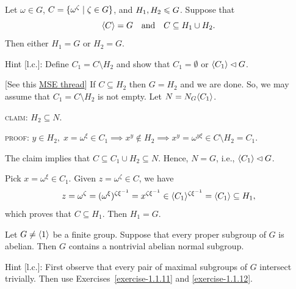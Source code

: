 \begin{exr}
    Let\/ $\omega \in G$, $C = \{\omega^\zeta \mid\zeta\in G\}$, and\/ $H_1, H_2\leqslant G$. Suppose that
    $$
        \langle C\rangle = G\quad\text{\upshape and}\quad C \subseteq H_1 \cup H_2.
    $$
    Then either\/ $H_1 = G$ or\/ $H_2 = G$.

    \textrm{\upshape Hint [l.c.]: Define $C_1=C\setminus H_2$ and show that $C_1=\emptyset$ or $\langle C_1\rangle\lhd G$.}
\end{exr}

\begin{solution} {[See this \href{https://math.stackexchange.com/a/1107676/269050}{MSE thread}]} If $C\subseteq H_2$ then $G=H_2$ and we are done. So, we may assume that $C_1=C\setminus H_2$ is not empty. Let $N=N_G\langle C_1\rangle$.

\textsc{claim:} $H_2\subseteq N$.

\textsc{proof:} $y\in H_2,\;x=\omega^\xi\in C_1\implies x^y\notin H_2\implies x^y=\omega^{y\xi}\in C\setminus H_2=C_1$.

The claim implies that $C\subseteq C_1\cup H_2 \subseteq N$. Hence, $N=G$, i.e., $\langle C_1\rangle\lhd G$.

Pick $x=\omega^\xi\in C_1$. Given $z=\omega^\zeta\in C$, we have
$$
    z = \omega^\zeta 
        = (\omega^\xi)^{\zeta\xi^{-1}}
        = x^{\zeta\xi^{-1}}
        \in \langle C_1\rangle^{\zeta\xi^{-1}}=\langle C_1\rangle \subseteq H_1,
$$
which proves that $C\subseteq H_1$. Then $H_1=G$.  \end{solution}

\begin{exr}
    Let\/ $G \ne\langle1\rangle$ be a finite group. Suppose that every proper subgroup of\/ $G$ is abelian. Then\/ $G$ contains a nontrivial abelian normal subgroup.

    \textrm{\upshape Hint [l.c.]: First observe that every pair of maximal subgroups of $G$ intersect trivially. Then use Exercises~\ref{exercise-1.1.11} and \ref{exercise-1.1.12}.}
\end{exr}

